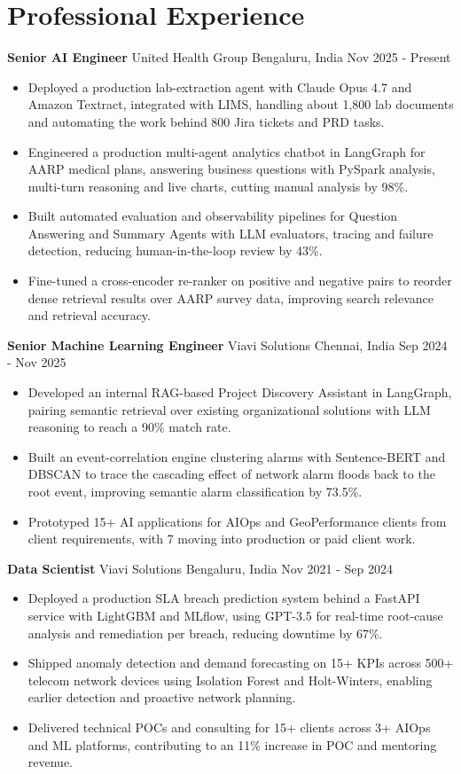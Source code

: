 \documentclass[10pt,a4paper]{article}
\newcommand{\role}[4]{\textbf{#1} \textbar{} #2 \hfill #3 \textbar{} #4\par}
\begin{document}
\section{Professional Experience}
\role{Senior AI Engineer}{United Health Group}{Bengaluru, India}{Nov 2025 - Present}
\begin{itemize}
  \item Deployed a production lab-extraction agent with Claude Opus 4.7 and Amazon Textract, integrated with LIMS, handling about 1,800 lab documents and automating the work behind 800 Jira tickets and PRD tasks.
  \item Engineered a production multi-agent analytics chatbot in LangGraph for AARP medical plans, answering business questions with PySpark analysis, multi-turn reasoning and live charts, cutting manual analysis by 98\%.
  \item Built automated evaluation and observability pipelines for Question Answering and Summary Agents with LLM evaluators, tracing and failure detection, reducing human-in-the-loop review by 43\%.
  \item Fine-tuned a cross-encoder re-ranker on positive and negative pairs to reorder dense retrieval results over AARP survey data, improving search relevance and retrieval accuracy.
\end{itemize}
\vspace{3pt}
\role{Senior Machine Learning Engineer}{Viavi Solutions}{Chennai, India}{Sep 2024 - Nov 2025}
\begin{itemize}
  \item Developed an internal RAG-based Project Discovery Assistant in LangGraph, pairing semantic retrieval over existing organizational solutions with LLM reasoning to reach a 90\% match rate.
  \item Built an event-correlation engine clustering alarms with Sentence-BERT and DBSCAN to trace the cascading effect of network alarm floods back to the root event, improving semantic alarm classification by 73.5\%.
  \item Prototyped 15+ AI applications for AIOps and GeoPerformance clients from client requirements, with 7 moving into production or paid client work.
\end{itemize}
\vspace{3pt}
\role{Data Scientist}{Viavi Solutions}{Bengaluru, India}{Nov 2021 - Sep 2024}
\begin{itemize}
  \item Deployed a production SLA breach prediction system behind a FastAPI service with LightGBM and MLflow, using GPT-3.5 for real-time root-cause analysis and remediation per breach, reducing downtime by 67\%.
  \item Shipped anomaly detection and demand forecasting on 15+ KPIs across 500+ telecom network devices using Isolation Forest and Holt-Winters, enabling earlier detection and proactive network planning.
  \item Delivered technical POCs and consulting for 15+ clients across 3+ AIOps and ML platforms, contributing to an 11\% increase in POC and mentoring revenue.
\end{itemize}
\end{document}
